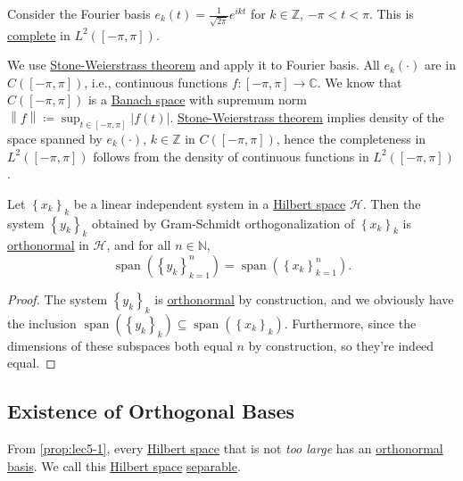 \begin{eg}
	Consider the Fourier basis \(e_k (t) = \frac{1}{\sqrt{2\pi }} e^{ikt}\) for \(k\in \mathbb{Z } \), \(-\pi < t < \pi \). This is \hyperref[def:complete-system]{complete} in \(L^2([-\pi , \pi ])\).
\end{eg}
\begin{explanation}
	We use \href{https://en.wikipedia.org/wiki/Stone%E2%80%93Weierstrass_theorem}{Stone-Weierstrass theorem} and apply it to Fourier basis. All \(e_k(\cdot)\) are in \(C([-\pi , \pi ])\), i.e., continuous functions \(f\colon [-\pi , \pi ]\to \mathbb{C} \). We know that \(C([-\pi , \pi ])\) is a \hyperref[def:Banach-space]{Banach space} with supremum norm \(\left\lVert f\right\rVert \coloneqq \sup _{t\in [-\pi, \pi ]}\left\vert f(t) \right\vert\). \href{https://en.wikipedia.org/wiki/Stone%E2%80%93Weierstrass_theorem}{Stone-Weierstrass theorem} implies density of the space spanned by \(e_k(\cdot)\), \(k\in \mathbb{Z } \) in \(C([-\pi , \pi ])\), hence the completeness in \(L^2([-\pi , \pi ])\) follows from the density of continuous functions in \(L^2([-\pi , \pi ])\). 
\end{explanation}

\begin{proposition}\label{prop:lec5-1}
	Let \(\left\{ x_k \right\} _k\) be a linear independent system in a \hyperref[def:Hilbert-space]{Hilbert space} \(\mathcal{H}\). Then the system \(\left\{ y_k \right\} _k\) obtained by Gram-Schmidt orthogonalization of \(\left\{ x_k \right\} _k\) is \hyperref[def:orthonormal-system]{orthonormal} in \(\mathcal{H} \), and for all \(n \in \mathbb{N}\),
	\[
		\operatorname{span}(\left\{ y_k \right\} _{k=1}^n) = \operatorname{span}(\left\{ x_k \right\} _{k=1}^n).
	\]
\end{proposition}
\begin{proof}
	The system \(\left\{ y_k \right\} _k\) is \hyperref[def:orthonormal-system]{orthonormal} by construction, and we obviously have the inclusion \(\operatorname{span}(\left\{ y_k \right\} _k) \subseteq \operatorname{span}(\left\{ x_k \right\} _k)\). Furthermore, since the dimensions of these subspaces both equal \(n\) by construction, so they're indeed equal.
\end{proof}

\subsection{Existence of Orthogonal Bases}
From \autoref{prop:lec5-1}, every \hyperref[def:Hilbert-space]{Hilbert space} that is not \emph{too large} has an \hyperref[def:orthonormal-basis]{orthonormal basis}. We call this \hyperref[def:Hilbert-space]{Hilbert space} \hyperref[def:separable]{separable}.

